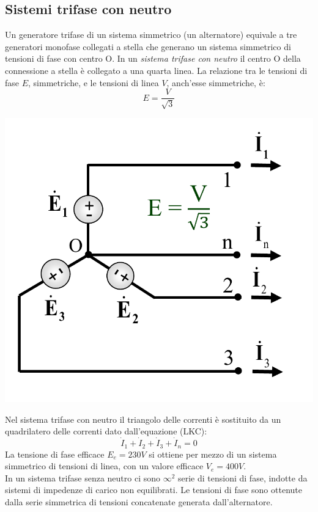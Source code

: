 \documentclass{article}
\begin{document}
\subsection{Sistemi trifase con neutro}
Un generatore trifase di un sistema
simmetrico (un alternatore) equivale a tre
generatori monofase collegati a stella che
generano un sistema simmetrico di tensioni di
fase con centro O. In un \textit{sistema trifase con
neutro} il centro O della connessione a stella è
collegato a una quarta linea. La relazione tra
le tensioni di fase $E$, simmetriche, e le tensioni
di linea $V$, anch'esse simmetriche, è:
\[E = \frac{V}{\sqrt{3}}\]
\begin{center}
    \includegraphics[scale=0.27]{Image/Sistemi_trifase_neutro_1.png}
\end{center}
Nel sistema trifase con neutro il triangolo
delle correnti è sostituito da un quadrilatero
delle correnti dato dall'equazione (LKC):
\[\dot I_1 + \dot I_2 + \dot I_3 + \dot I_n =0\]
La tensione di fase efficace $E_e = 230 V$ si ottiene per mezzo di un sistema simmetrico di tensioni di linea, con un valore efficace $V_e = 400 V$.
\vspace*{0.2cm}\\
In un sistema trifase senza neutro ci
sono $\infty^2$ serie di tensioni di fase, indotte da sistemi di impedenze di carico non
equilibrati. Le tensioni di fase sono ottenute dalla serie simmetrica di tensioni
concatenate generata dall'alternatore.
\end{document}
